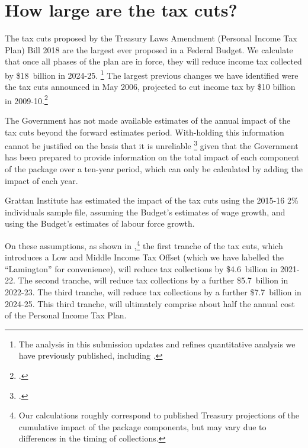 \documentclass[submission]{grattan}\usepackage[]{graphicx}\usepackage[]{color}
\begin{document}
\chapter{How large are the tax cuts?}\label{chap:how-large-are-the-tax-cuts}

The tax cuts proposed by the Treasury Laws Amendment (Personal Income Tax Plan) Bill 2018 are the largest ever proposed in a Federal Budget. We calculate that once all phases of the plan are in force, they will reduce income tax collected by \$18~billion in 2024-25.%
  \footnote{The analysis in this submission updates and refines quantitative analysis we have previously published, including \textcite{DaleyWood2018}.}
The largest previous changes we have identified were the tax cuts announced in May 2006, projected to cut income tax by \$10 billion in 2009-10.\footcite[][23]{Treasury2006}

The Government has not made available estimates of the annual impact of the tax cuts beyond the forward estimates period. With-holding this information cannot be justified on the basis that it is unreliable%
  \footcite{Murphy2018}
given that the Government has been prepared to provide information on the total impact of each component of the package over a ten-year period, which can only be calculated by adding the impact of each year.

Grattan Institute has estimated the impact of the tax cuts using the 2015-16 2\% individuals sample file, assuming the Budget's estimates of wage growth, and using the Budget's estimates of labour force growth.

On these assumptions, as shown in  ,\footnote{Our calculations roughly correspond to published Treasury projections of the cumulative impact of the package components, but may vary due to differences in the timing of collections.}
the first tranche of the tax cuts, which introduces a Low and Middle Income Tax Offset (which we have labelled the ``Lamington'' for convenience), will reduce tax collections by \$4.6~billion in 2021-22. The second tranche, will reduce tax collections by a further \$5.7~billion in 2022-23. The third tranche, will reduce tax collections by a further \$7.7~billion in 2024-25. This third tranche, will ultimately comprise about half the annual cost of the Personal Income Tax Plan.
\end{document}
